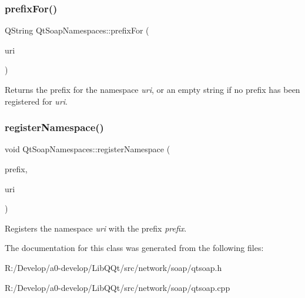 \subsubsection{\texorpdfstring{prefix\+For()}{prefixFor()}}
{\footnotesize\ttfamily Q\+String Qt\+Soap\+Namespaces\+::prefix\+For (\begin{DoxyParamCaption}\item[{const Q\+String \&}]{uri }\end{DoxyParamCaption})}

Returns the prefix for the namespace {\itshape uri}, or an empty string if no prefix has been registered for {\itshape uri}. \mbox{\label{class_qt_soap_namespaces_aef73fe57357526093afb3fa423c3599c}} 
\subsubsection{\texorpdfstring{register\+Namespace()}{registerNamespace()}}
{\footnotesize\ttfamily void Qt\+Soap\+Namespaces\+::register\+Namespace (\begin{DoxyParamCaption}\item[{const Q\+String \&}]{prefix,  }\item[{const Q\+String \&}]{uri }\end{DoxyParamCaption})}

Registers the namespace {\itshape uri} with the prefix {\itshape prefix}. 

The documentation for this class was generated from the following files\+:\begin{DoxyCompactItemize}
\item 
R\+:/\+Develop/a0-\/develop/\+Lib\+Q\+Qt/src/network/soap/qtsoap.\+h\item 
R\+:/\+Develop/a0-\/develop/\+Lib\+Q\+Qt/src/network/soap/qtsoap.\+cpp\end{DoxyCompactItemize}
